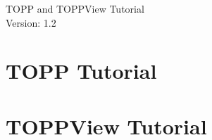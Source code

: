 \documentclass[a4paper]{article}
\begin{document}
\begin{titlepage}
\vspace*{7cm}
\begin{center}
{\Large TOPP and TOPPView Tutorial\\[1ex]\large Version: 1.2 }\\
\end{center}
\end{titlepage}


\setcounter{tocdepth}{2}
\tableofcontents
\pagebreak

\section{TOPP Tutorial}
	
	
	\pagebreak
	
	\pagebreak
	
	\pagebreak
	
	\pagebreak
	
	\pagebreak
	
	\pagebreak
	
	\pagebreak
	
	\pagebreak
	
	\pagebreak
	

\section{TOPPView Tutorial}
	
	
	\pagebreak
	
	\pagebreak
	
	\pagebreak
	
	\pagebreak
	
	\pagebreak
	
\end{document}
